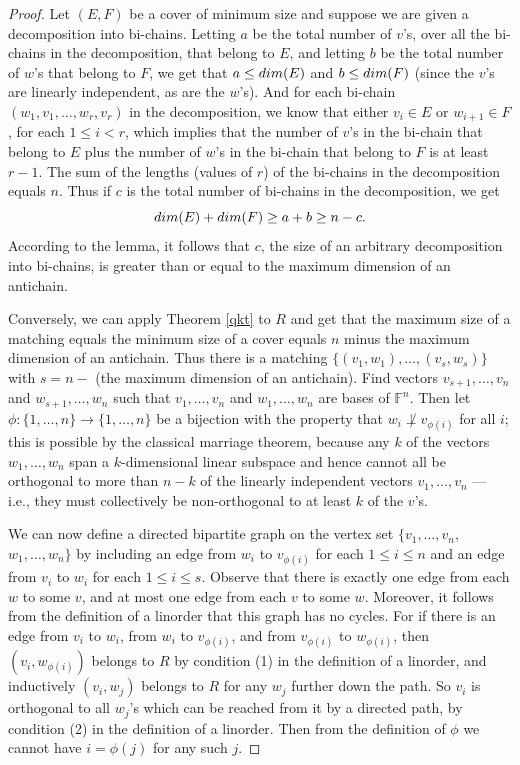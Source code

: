 \documentclass[10pt,a4paper]{amsart}
\begin{document}
\begin{proof}
Let $(E,F)$ be a cover of minimum size and suppose we are given a decomposition into bi-chains. Letting $a$ be the total number of $v$'s, over all the bi-chains in the decomposition, that belong to $E$, and letting $b$ be the total number of $w$'s that belong to $F$, we get that $a \leq {\rm dim}(E)$ and $b \leq {\rm dim}(F)$ (since the $v$'s are linearly independent, as are the $w$'s). And for each bi-chain $(w_1, v_1, \ldots, w_r, v_r)$ in the decomposition, we know that either $v_i \in E$ or $w_{i+1} \in F$, for each $1 \leq i < r$, which implies that the number of $v$'s in the bi-chain that belong to $E$ plus the number of $w$'s in the bi-chain that belong to $F$ is at least $r - 1$. The sum of the lengths (values of $r$) of the bi-chains in the decomposition equals $n$. Thus if $c$ is the total number of bi-chains in the decomposition, we get $${\rm dim}(E) + {\rm dim}(F) \geq a + b \geq n - c.$$ According to the lemma, it follows that $c$, the size of an arbitrary decomposition into bi-chains, is greater than or equal to the maximum dimension of an antichain.

Conversely, we can apply Theorem \ref{qkt} to $R$ and get that the maximum size of a matching equals the minimum size of a cover equals $n$ minus the maximum dimension of an antichain. Thus there is a matching $\{(v_1, w_1), \ldots, (v_s, w_s)\}$ with $s = n -$ (the maximum dimension of an antichain). Find vectors $v_{s+1}, \ldots, v_n$ and $w_{s+1}, \ldots, w_n$ such that $v_1, \ldots, v_n$ and $w_1, \ldots, w_n$ are bases of $\mathbb{F}^n$. Then let $\phi: \{1, \ldots, n\} \to \{1, \ldots, n\}$ be a bijection with the property that $w_i \not\perp v_{\phi(i)}$ for all $i$; this is possible by the classical marriage theorem, because any $k$ of the vectors $w_1, \ldots, w_n$ span a $k$-dimensional linear subspace and hence cannot all be orthogonal to more than $n-k$ of the linearly independent vectors $v_1, \ldots, v_n$ --- i.e., they must collectively be non-orthogonal to at least $k$ of the $v$'s.

We can now define a directed bipartite graph on the vertex set $\{v_1, \ldots, v_n$, $w_1, \ldots, w_n\}$ by including an edge from $w_i$ to $v_{\phi(i)}$ for each $1 \leq i \leq n$ and an edge from $v_i$ to $w_i$ for each $1 \leq i \leq s$. Observe that there is exactly one edge from each $w$ to some $v$, and at most one edge from each $v$ to some $w$. Moreover, it follows from the definition of a linorder that this graph has no cycles. For if there is an edge from $v_i$ to $w_i$, from $w_i$ to $v_{\phi(i)}$, and from $v_{\phi(i)}$ to $w_{\phi(i)}$, then $(v_i, w_{\phi(i)})$ belongs to $R$ by condition (1) in the definition of a linorder, and inductively $(v_i, w_j)$ belongs to $R$ for any $w_j$ further down the path. So $v_i$ is orthogonal to all $w_j$'s which can be reached from it by a directed path, by condition (2) in the definition of a linorder. Then from the definition of $\phi$ we cannot have $i = \phi(j)$ for any such $j$.


\end{proof}
\end{document}
